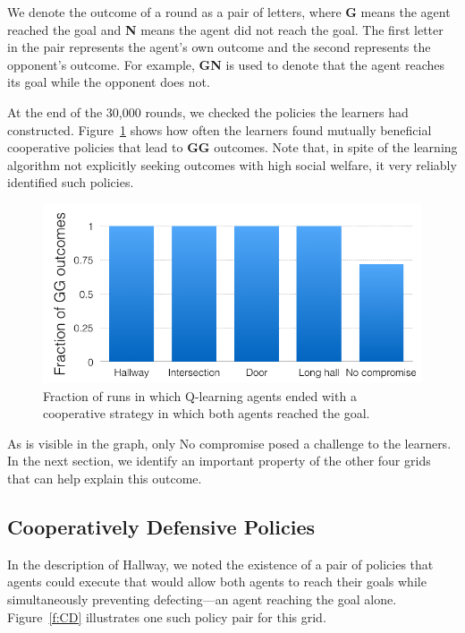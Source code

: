 \documentclass[letterpaper]{article}
\begin{document}

We denote the outcome of a round as a pair of letters, where {\bf G}
means the agent reached the goal and {\bf N} means the agent did not
reach the goal. The first letter in the pair represents the agent's
own outcome and the second represents the opponent's outcome. For
example, {\bf GN} is used to denote that the agent reaches its goal
while the opponent does not.

At the end of the 30,000 rounds, we checked the policies the learners
had constructed. Figure~\ref{f:coop} shows how often the learners
found mutually beneficial cooperative policies that lead to {\bf GG}
outcomes. Note that, in spite of the learning algorithm not explicitly
seeking outcomes with high social welfare, it very reliably identified
such policies.

\begin{figure}
\centering
\includegraphics[width=0.9\columnwidth]{figures/coop.png}
\caption{Fraction of runs in which Q-learning agents ended with a cooperative
strategy in which both agents reached the goal.}
\label{f:coop}
\end{figure}

As is visible in the graph, only No compromise posed a challenge to
the learners. In the next section, we identify an important property
of the other four grids that can help explain this outcome.

\subsection{Cooperatively Defensive Policies}

In the description of Hallway, we noted the existence of a
pair of policies that agents could execute that would allow both
agents to reach their goals while simultaneously preventing
defecting---an agent reaching the goal alone. Figure~\ref{f:CD}
illustrates one such policy pair for this grid.
\end{document}
